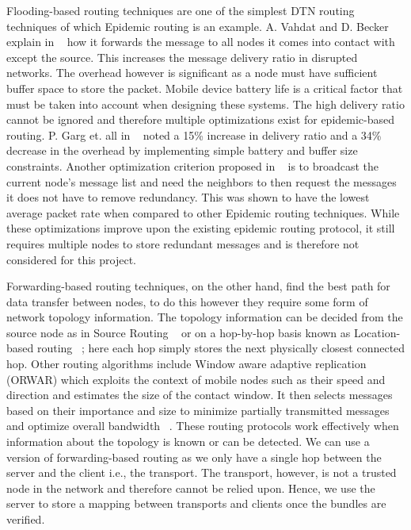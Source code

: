 Flooding-based routing techniques are one of the simplest DTN routing techniques of which Epidemic routing is an example. A. Vahdat and D. Becker explain in ~\cite{rw5} how it forwards the message to all nodes it comes into contact with except the source. This increases the message delivery ratio in disrupted networks. The overhead however is significant as a node must have sufficient buffer space to store the packet. Mobile device battery life is a critical factor that must be taken into account when designing these systems. The high delivery ratio cannot be ignored and therefore multiple optimizations exist for epidemic-based routing. P. Garg et. all in ~\cite{rw6} noted a 15\% increase in delivery ratio and a 34\% decrease in the overhead by implementing simple battery and buffer size constraints. Another optimization criterion proposed in ~\cite{rw7} is to broadcast the current node’s message list and need the neighbors to then request the messages it does not have to remove redundancy. This was shown to have the lowest average packet rate when compared to other Epidemic routing techniques. While these optimizations improve upon the existing epidemic routing protocol, it still requires multiple nodes to store redundant messages and is therefore not considered for this project.


Forwarding-based routing techniques, on the other hand, find the best path for data transfer between nodes, to do this however they require some form of network topology information. The topology information can be decided from the source node as in Source Routing ~\cite{rw8} or on a hop-by-hop basis known as Location-based routing ~\cite{rw8}; here each hop simply stores the next physically closest connected hop. Other routing algorithms include Window aware adaptive replication (ORWAR) which exploits the context of mobile nodes such as their speed and direction and estimates the size of the contact window. It then selects messages based on their importance and size to minimize partially transmitted messages and optimize overall bandwidth ~\cite{rw9}. These routing protocols work effectively when information about the topology is known or can be detected. We can use a version of forwarding-based routing as we only have a single hop between the server and the client i.e., the transport. The transport, however, is not a trusted node in the network and therefore cannot be relied upon. Hence, we use the server to store a mapping between transports and clients once the bundles are verified.

